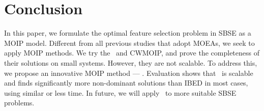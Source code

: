 \section{Conclusion}\label{sec:conclusion}
In this paper, we formulate the optimal feature selection problem in SBSE as a MOIP model. Different from all previous studies that adopt MOEAs, we seek to apply MOIP methods. We try the \naiveSol~and CWMOIP, and prove the completeness of their solutions on small systems. However, they are not scalable. To address this, we propose an innovative MOIP method --- \ourSol. Evaluation shows that \ourSol~is scalable and finds significantly more non-dominant solutions than IBED in most cases, using similar or less time. In future, we will apply \ourSol~to more suitable SBSE problems.
